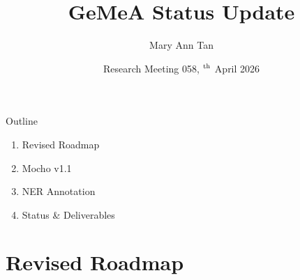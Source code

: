 \documentclass[xcolor,aspectratio=169,compress]{beamer}
\title[RM 058 --- GeMeA Status]{GeMeA Status Update}
\author[M.A.\ Tan]{Mary Ann Tan}
\institute[FIZ-KDAI]{FIZ Karlsruhe -- Leibniz Institute for Information Infrastructure, KDAI}
\date[RM 058, 29.04.2026]{Research Meeting 058, {\sansmath 29$^{\rm th}$} April 2026}
\begin{document}
\frame[plain]{\titlepage}

\begin{frame}{Outline}
  \begin{enumerate}
    \item Revised Roadmap
    \item Mocho v1.1
    \item NER Annotation
    \item Status \& Deliverables
  \end{enumerate}
\end{frame}

\section{Revised Roadmap}
\end{document}

